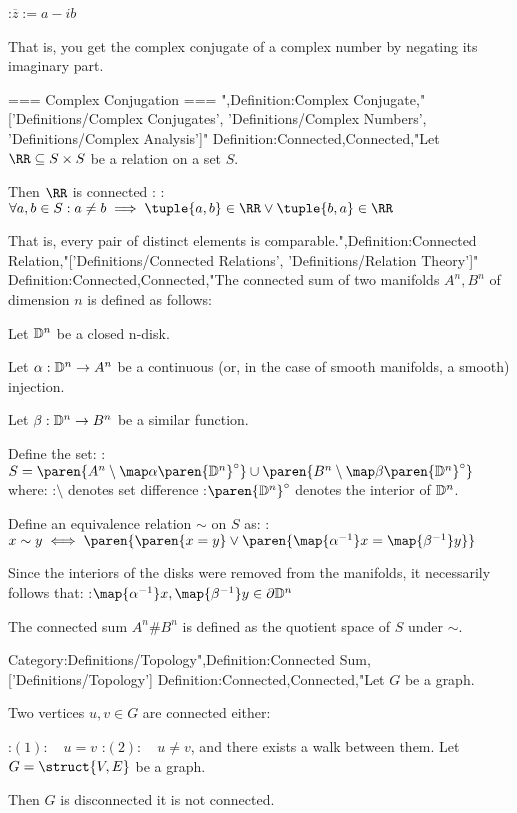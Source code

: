 :$\overline z := a - i b$


That is, you get the complex conjugate of a complex number by negating its imaginary part.


=== Complex Conjugation ===
",Definition:Complex Conjugate,"['Definitions/Complex Conjugates', 'Definitions/Complex Numbers', 'Definitions/Complex Analysis']"
Definition:Connected,Connected,"Let $\RR \subseteq S \times S$ be a relation on a set $S$.


Then $\RR$ is connected :
:$\forall a, b \in S: a \ne b \implies \tuple {a, b} \in \RR \lor \tuple {b, a} \in \RR$


That is,  every pair of distinct elements is comparable.",Definition:Connected Relation,"['Definitions/Connected Relations', 'Definitions/Relation Theory']"
Definition:Connected,Connected,"The connected sum of two manifolds $A^n, B^n$ of dimension $n$ is defined as follows:

Let $\Bbb D^n$ be a closed n-disk.

Let $\alpha: \Bbb D^n \to A^n$ be a continuous (or, in the case of smooth manifolds, a smooth) injection.

Let $\beta: \Bbb D^n \to B^n$ be a similar function.  


Define the set:
:$S = \paren {A^n \setminus \map \alpha {\paren {\Bbb D^n}^\circ} } \cup \paren {B^n \setminus \map \beta {\paren {\Bbb D^n}^\circ} }$
where:
:$\setminus$ denotes set difference
:$\paren {\Bbb D^n}^\circ$ denotes the interior of $\Bbb  D^n$.


Define an equivalence relation $\sim$ on $S$ as:
:$x \sim y \iff \paren {\paren {x = y} \lor \paren {\map {\alpha^{-1} } x = \map {\beta^{-1} } y} }$


Since the interiors of the disks were removed from the manifolds, it necessarily follows that:
:$\map {\alpha^{-1} } x, \map {\beta^{-1} } y \in \partial \Bbb D^n$


The connected sum $A^n \# B^n$ is defined as the quotient space of $S$ under $\sim$.

Category:Definitions/Topology",Definition:Connected Sum,['Definitions/Topology']
Definition:Connected,Connected,"Let $G$ be a graph.

Two vertices $u, v \in G$ are connected  either:

:$(1): \quad u = v$
:$(2): \quad u \ne v$, and there exists a walk between them.
Let $G = \struct {V, E}$ be a graph.

Then $G$ is disconnected  it is not connected.

